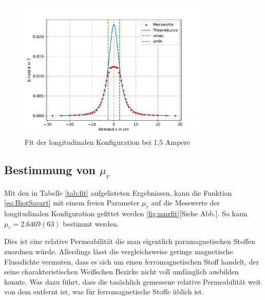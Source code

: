 \documentclass[11pt, a4paper]{article}
\begin{document}
    \begin{figure}
        \centering
        \includegraphics[width=0.8\textwidth]{fit15a.pdf}
        \caption{Fit der longitudinalen Konfiguration bei 1,5 Ampere}
        \label{fig:longfit15a}
    \end{figure}

    \subsection{Bestimmung von $\mu_r$}
    Mit den in Tabelle \ref{tab:fit} aufgelisteten Ergebnissen, kann die Funktion \ref{eq:BiotSavart} mit einem freien Parameter $\mu_r$ auf die Messwerte der longitudinalen Konfiguration gefittet werden \ref{fig:murfit}[Siehe Abb.]. So kann $\mu_r = 2.6469(63)$ bestimmt werden.
    
    Dies ist eine relative Permeabilität die man eigentlich paramagnetischen Stoffen zuordnen würde. Allerdings lässt die vergleichsweise geringe magnetische Flussdichte vermuten, dass es sich um einen ferromagnetischen Stoff handelt, der seine charakteristischen Weißschen Bezirke nicht voll umfänglich ausbilden konnte.
    Was dazu führt, dass die tasächlich gemessene relative Permeabilität weit von dem entfernt ist, was für ferromagnetische Stoffe üblich ist.
    
\end{document}

